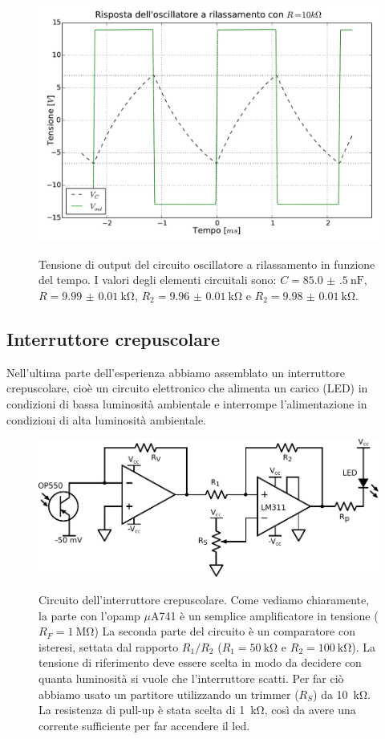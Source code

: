 \begin{figure}[ht]
 \centering
   {\includegraphics[width=14.5cm]{../E04/latex/osc10k.pdf}}
 \caption{Tensione di output del circuito oscillatore a rilassamento in funzione del tempo. I valori degli elementi circuitali sono: $C=\SI{85.0(5)}{\nano\farad}$, $R=\SI{9.99(1)}{\kohm}$, $R_2= \SI{9.96(1)}{\kohm}$ e $R_2=\SI{9.98(1)}{\kohm}$.}
 \label{gr4:osc10k}
\end{figure}

\subsection{Interruttore crepuscolare}

Nell'ultima parte dell'esperienza abbiamo assemblato un interruttore crepuscolare, cioè un circuito elettronico che alimenta un carico (LED) in condizioni di bassa luminosità ambientale e interrompe l'alimentazione in condizioni di alta luminosità ambientale.

\begin{figure}[ht]
 \centering
   {\includegraphics[width=12.5cm]{../E04/latex/c_crepuscolare.pdf}}
 \caption{Circuito dell'interruttore crepuscolare. Come vediamo chiaramente, la parte con l'opamp $\mu$A741 è un semplice amplificatore in tensione ($R_F = \SI{1}{\Mohm}$) La seconda parte del circuito è un comparatore con isteresi, settata dal rapporto $R_1/R_2$ ($R_1 = \SI{50}{\kohm}$ e $R_2 = \SI{100}{\kohm}$). La tensione di riferimento deve essere scelta in modo da decidere con quanta luminosità si vuole che l'interruttore scatti. Per far ciò abbiamo usato un partitore utilizzando un trimmer ($R_S$) da \SI{10}{\kohm}. La resistenza di pull-up è stata scelta di  \SI{1}{\kohm}, così da avere una corrente sufficiente per far accendere il led.}
 \label{cir4:crepuscolare}
\end{figure}

